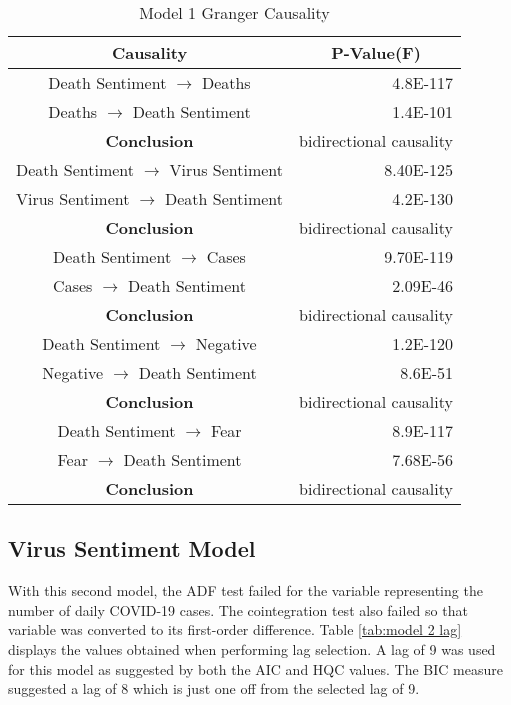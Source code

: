 \begin{table}[H]
\centering
\begin{tabular}{@{}cr@{}}
\toprule
\textbf{Causality} & \multicolumn{1}{c}{\textbf{P-Value(F)}} \\ \midrule
Death Sentiment $\rightarrow$ Deaths & 4.8E-117 \\
Deaths $\rightarrow$ Death Sentiment & 1.4E-101 \\
\textbf{Conclusion} & \multicolumn{1}{c}{bidirectional causality} \\
Death Sentiment $\rightarrow$ Virus Sentiment & 8.40E-125 \\
Virus Sentiment $\rightarrow$ Death Sentiment & 4.2E-130 \\
\textbf{Conclusion} & \multicolumn{1}{c}{bidirectional causality} \\
Death Sentiment $\rightarrow$ Cases & 9.70E-119 \\
Cases $\rightarrow$ Death Sentiment & 2.09E-46 \\
\textbf{Conclusion} & \multicolumn{1}{c}{bidirectional causality} \\
Death Sentiment $\rightarrow$ Negative & 1.2E-120 \\
Negative $\rightarrow$ Death Sentiment & 8.6E-51 \\
\textbf{Conclusion} & \multicolumn{1}{c}{bidirectional causality} \\
Death Sentiment $\rightarrow$ Fear & 8.9E-117 \\
Fear $\rightarrow$ Death Sentiment & 7.68E-56 \\
\textbf{Conclusion} & \multicolumn{1}{c}{bidirectional causality} \\ \bottomrule
\end{tabular}
\caption{Model 1 Granger Causality}
\label{tab:model 1 causality}
\end{table}

\subsection{Virus Sentiment Model}

With this second model, the ADF test failed for the variable representing the number of daily COVID-19 cases. The cointegration test also failed so that variable was converted to its first-order difference. Table \ref{tab:model 2 lag} displays the values obtained when performing lag selection. A lag of 9 was used for this model as suggested by both the AIC and HQC values. The BIC measure suggested a lag of 8 which is just one off from the selected lag of 9.

